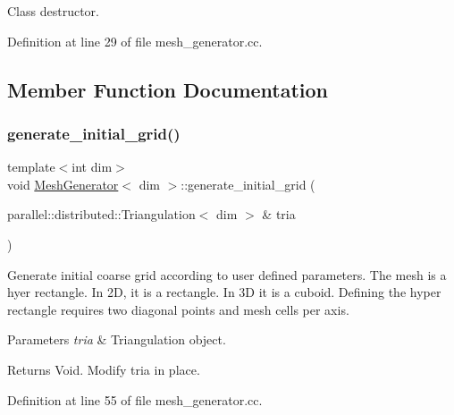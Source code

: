 Class destructor. 



Definition at line 29 of file mesh\+\_\+generator.\+cc.



\subsection{Member Function Documentation}
\mbox{\label{class_mesh_generator_a57b433e53fa1b80670a76a1e0c898963}} 
\subsubsection{\texorpdfstring{generate\+\_\+initial\+\_\+grid()}{generate\_initial\_grid()}}
{\footnotesize\ttfamily template$<$int dim$>$ \\
void \hyperlink{class_mesh_generator}{Mesh\+Generator}$<$ dim $>$\+::generate\+\_\+initial\+\_\+grid (\begin{DoxyParamCaption}\item[{parallel\+::distributed\+::\+Triangulation$<$ dim $>$ \&}]{tria }\end{DoxyParamCaption})\hspace{0.3cm}{\ttfamily [private]}}

Generate initial coarse grid according to user defined parameters. The mesh is a hyer rectangle. In 2D, it is a rectangle. In 3D it is a cuboid. Defining the hyper rectangle requires two diagonal points and mesh cells per axis.


\begin{DoxyParams}{Parameters}
{\em tria} & Triangulation object. \\
\hline
\end{DoxyParams}
\begin{DoxyReturn}{Returns}
Void. Modify tria in place. 
\end{DoxyReturn}


Definition at line 55 of file mesh\+\_\+generator.\+cc.

\mbox{\label{class_mesh_generator_a9b3414fd31d1d06b0cc4a0c345bc6542}} 
